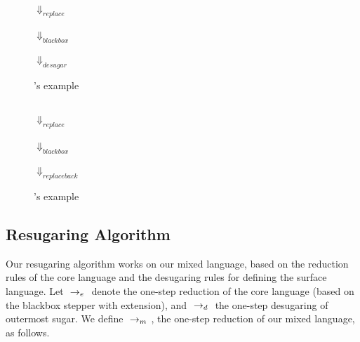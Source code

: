 \begin{center}
\begin{figure}[thb]
\centering
{}\\ $\Downarrow_{replace}$\\ \\ $\Downarrow_{blackbox}$\\ \\ $\Downarrow_{desugar}$\\ 
\caption{'s example}
\label{fig:e1}
\end{figure}

\begin{figure}[thb]
\centering
{}\\ $\Downarrow_{replace}$ \\\\ $\Downarrow_{blackbox}$\\  \\ $\Downarrow_{replaceback}$\\ 
\caption{'s example}
\label{fig:e2}
\end{figure}



\end{center}

\subsection{Resugaring Algorithm}

Our resugaring algorithm works on our mixed language, based on the reduction rules of the core language and the desugaring rules for defining the surface language. Let $~\rightarrow_e~$ denote the one-step reduction of the core language (based on the blackbox stepper with extension), and $~\rightarrow_d~$ the one-step desugaring of outermost sugar. We define $~\rightarrow_m~$, the one-step reduction of our mixed language, as follows.

\label{mark:miexedreduction}
{}

